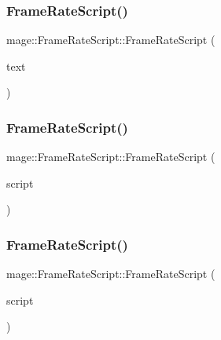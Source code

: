 \subsubsection{\texorpdfstring{Frame\+Rate\+Script()}{FrameRateScript()}\hspace{0.1cm}{\footnotesize\ttfamily [1/3]}}
{\footnotesize\ttfamily mage\+::\+Frame\+Rate\+Script\+::\+Frame\+Rate\+Script (\begin{DoxyParamCaption}\item[{\hyperlink{namespacemage_a1e01ae66713838a7a67d30e44c67703e}{Shared\+Ptr}$<$ \hyperlink{classmage_1_1_sprite_text}{Sprite\+Text} $>$}]{text }\end{DoxyParamCaption})\hspace{0.3cm}{\ttfamily [explicit]}}

\hypertarget{classmage_1_1_frame_rate_script_a2c76a1ce175c5c5370582d7ccb878132}{}\label{classmage_1_1_frame_rate_script_a2c76a1ce175c5c5370582d7ccb878132} 
\subsubsection{\texorpdfstring{Frame\+Rate\+Script()}{FrameRateScript()}\hspace{0.1cm}{\footnotesize\ttfamily [2/3]}}
{\footnotesize\ttfamily mage\+::\+Frame\+Rate\+Script\+::\+Frame\+Rate\+Script (\begin{DoxyParamCaption}\item[{const \hyperlink{classmage_1_1_frame_rate_script}{Frame\+Rate\+Script} \&}]{script }\end{DoxyParamCaption})\hspace{0.3cm}{\ttfamily [delete]}}

\hypertarget{classmage_1_1_frame_rate_script_af2cb69b7338169598b80938e9ad77cdd}{}\label{classmage_1_1_frame_rate_script_af2cb69b7338169598b80938e9ad77cdd} 
\subsubsection{\texorpdfstring{Frame\+Rate\+Script()}{FrameRateScript()}\hspace{0.1cm}{\footnotesize\ttfamily [3/3]}}
{\footnotesize\ttfamily mage\+::\+Frame\+Rate\+Script\+::\+Frame\+Rate\+Script (\begin{DoxyParamCaption}\item[{\hyperlink{classmage_1_1_frame_rate_script}{Frame\+Rate\+Script} \&\&}]{script }\end{DoxyParamCaption})\hspace{0.3cm}{\ttfamily [default]}}

